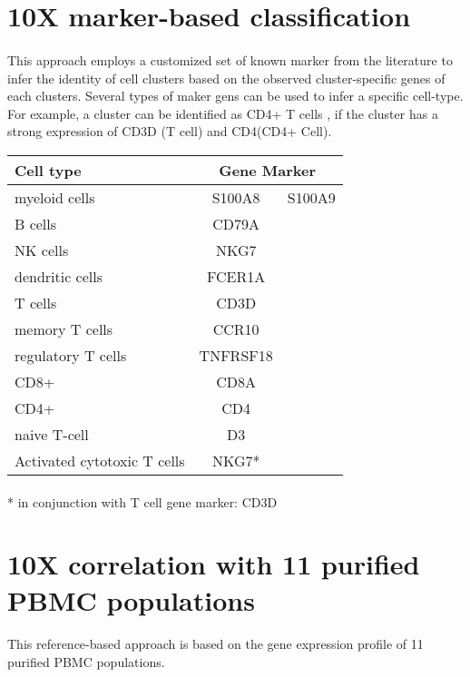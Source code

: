 \documentclass{article}
\begin{document}
\section{10X marker-based classification}
\paragraph{}
This approach employs a customized set of known marker from the literature to infer the identity of cell clusters  based on the observed cluster-specific genes of each clusters. Several types of maker gens can be used to infer a specific cell-type. For example, a cluster can be identified as CD4+ T cells , if the cluster has a strong expression of CD3D (T cell) and CD4(CD4+ Cell). \\ 
\par
\begin{tabular}{ |l|c |r| }
\hline
Cell type&\multicolumn{2}{|c|}{Gene Marker} \\ \hline
myeloid cells&S100A8&S100A9 \\ \hline
B cells	&CD79A&\\ \hline	
NK cells&NKG7&\\	\hline
dendritic cells&FCER1A&\\ \hline	
T cells&CD3D&\\	\hline
memory T cells&CCR10&\\	\hline
regulatory T cells&TNFRSF18&\\ \hline	
CD8+&CD8A&\\	\hline
CD4+&CD4&\\	\hline
naive T-cell&D3& \\	\hline
Activated cytotoxic T cells&NKG7*& \\ 	
\hline
\end{tabular}
\paragraph{}
* in conjunction with T cell gene marker: CD3D 
\section{10X correlation with 11 purified PBMC populations}
\paragraph{}
This reference-based approach is based on the gene expression profile of 11 purified PBMC populations.
\end{document}
